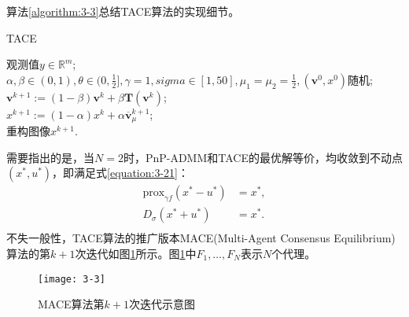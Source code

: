 算法\ref{algorithm:3-3}总结TACE算法的实现细节。
\begin{algorithm}[!htbp]
	\caption{TACE}
	\label{algorithm:3-3}
	\begin{algorithmic}[1]
		\REQUIRE	观测值$y\in \mathbb{R}^m$; %
		\ENSURE		%
		$\alpha,\beta\in (0,1), \theta\in(0,\frac{1}{2}],\gamma{=1}, sigma\in[1,50], \mu_{1}=\mu_{2}=\frac{1}{2},(\mathbf{v}^0,x^0)$随机; \\
		\STATE	$\mathbf{v}^{k+1}:=(1-\beta)\mathbf{v}^{k}+\beta\mathbf{T}(\mathbf{v}^{k})$; \\  %
		\STATE	$x^{k+1}:=(1-\alpha)x^k + \alpha\overline{\mathbf{v}}_{\mu}^{k+1}$; \\	%
		\ENDWHILE
		\RETURN 重构图像$x^{k+1}$.  %
	\end{algorithmic}
\end{algorithm}
需要指出的是，当$N=2$时，PnP-ADMM和TACE的最优解等价，均收敛到不动点$(x^*, u^*)$，即满足式\eqref{equation:3-21}：
\begin{equation} \label{equation:3-21}
	\begin{aligned}
		\text{prox}_{\gamma{f}}(x^*-u^*)&=x^*, \\
		D_{\sigma}(x^*+u^*)&=x^*. \\
	\end{aligned}
\end{equation}
不失一般性，TACE算法的推广版本MACE(Multi-Agent Consensus
Equilibrium)算法的第$k+1$次迭代如图\ref{fig:3-3}所示。图\ref{fig:3-3}中$F_{1},\ldots,F_{N}$表示$N$个代理。
\begin{figure}[!hptb]
	\centering
	\texttt{[image: 3-3]}
	\caption{MACE算法第$k+1$次迭代示意图}\label{fig:3-3}
\end{figure}


